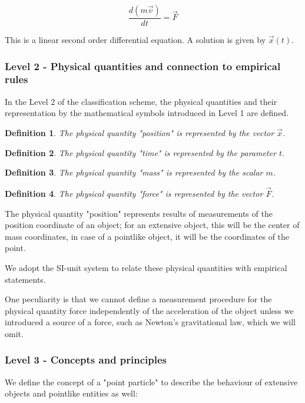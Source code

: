 \documentclass{article}
\newtheorem{mydef}{Definition} %
\begin{document}
\begin{equation}
\frac{d(m\vec v)}{dt}=\vec F
\end{equation}

This is a linear second order differential equation. A solution is given by $\vec  x(t)$.

\subsubsection*{Level 2 - Physical quantities and connection to empirical rules}

In the Level 2 of the classification scheme, the physical quantities and their representation by the mathematical symbols introduced in Level 1 are defined.

\begin{mydef}
The physical quantity "position" is represented by the vector $\vec x$.
\end{mydef}
\begin{mydef}
The physical quantity "time" is represented by the parameter $t$.
\end{mydef}
\begin{mydef}
The physical quantity "mass" is represented by the scalar $m$.
\end{mydef}
\begin{mydef}
The physical quantity "force" is represented by the vector $\vec F$.
\end{mydef}

The physical quantity "position" represents results of measurements of the position coordinate of an object; for an extensive object, this will be the center of mass coordinates, in case of a pointlike object, it will be the coordinates of the point. 

We adopt the SI-unit system to relate these physical quantities with empirical statements. 

One peculiarity is that we cannot define a measurement procedure for the physical quantity force independently of the acceleration of the object unless we introduced a source of a force, such as Newton's gravitational law, which we will omit. 

\subsubsection*{Level 3 - Concepts and principles}

We define the concept of a "point particle" to describe the behaviour of extensive objects and pointlike entities as well: 
\end{document}
